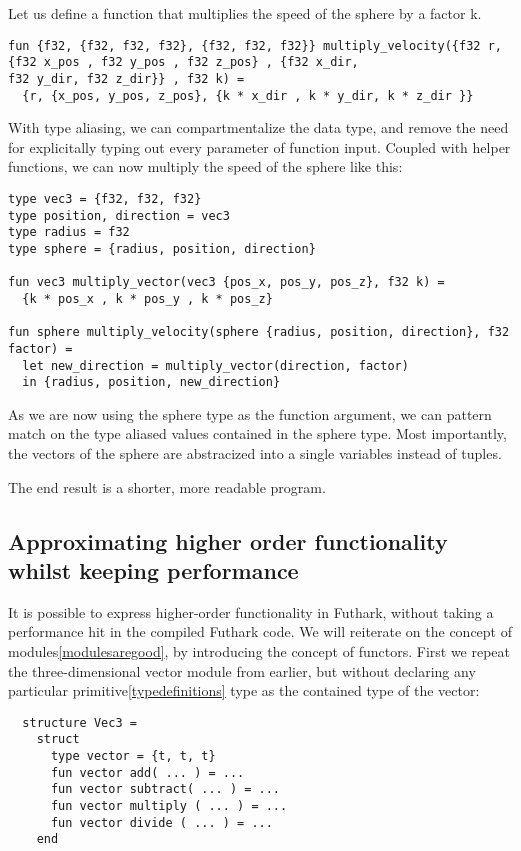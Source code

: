 Let us define a function that multiplies the speed of the sphere by a factor k.
\begin{verbatim}
fun {f32, {f32, f32, f32}, {f32, f32, f32}} multiply_velocity({f32 r, {f32 x_pos , f32 y_pos , f32 z_pos} , {f32 x_dir,
f32 y_dir, f32 z_dir}} , f32 k) =
  {r, {x_pos, y_pos, z_pos}, {k * x_dir , k * y_dir, k * z_dir }}
\end{verbatim}

With type aliasing, we can compartmentalize the data type, and remove the need
for explicitally typing out every parameter of function input.
Coupled with helper functions, we can now multiply the speed of the sphere like
this:

\begin{verbatim}
type vec3 = {f32, f32, f32}
type position, direction = vec3 
type radius = f32
type sphere = {radius, position, direction}

fun vec3 multiply_vector(vec3 {pos_x, pos_y, pos_z}, f32 k) =
  {k * pos_x , k * pos_y , k * pos_z}

fun sphere multiply_velocity(sphere {radius, position, direction}, f32 factor) =
  let new_direction = multiply_vector(direction, factor)
  in {radius, position, new_direction}
\end{verbatim}

As we are now using the sphere type as the function argument, we can pattern
match on the type aliased values contained in the sphere type.
Most importantly, the vectors of the sphere are abstracized into a single variables
instead of tuples.

The end result is a shorter, more readable program. %



\subsection{Approximating higher order functionality whilst keeping performance}
\label{subsec:higherorderfunctionality}
It is possible to express higher-order functionality in Futhark, without taking
a performance hit in the compiled Futhark code.
We will reiterate on the concept of modules\ref{modulesaregood}, by introducing
the concept of functors.
First we repeat the three-dimensional vector module
from earlier, but without declaring any particular
primitive\ref{typedefinitions} type as the contained type of the vector:
\begin{verbatim}
  structure Vec3 = 
    struct
      type vector = {t, t, t}
      fun vector add( ... ) = ...
      fun vector subtract( ... ) = ...
      fun vector multiply ( ... ) = ...
      fun vector divide ( ... ) = ...
    end
\end{verbatim}

